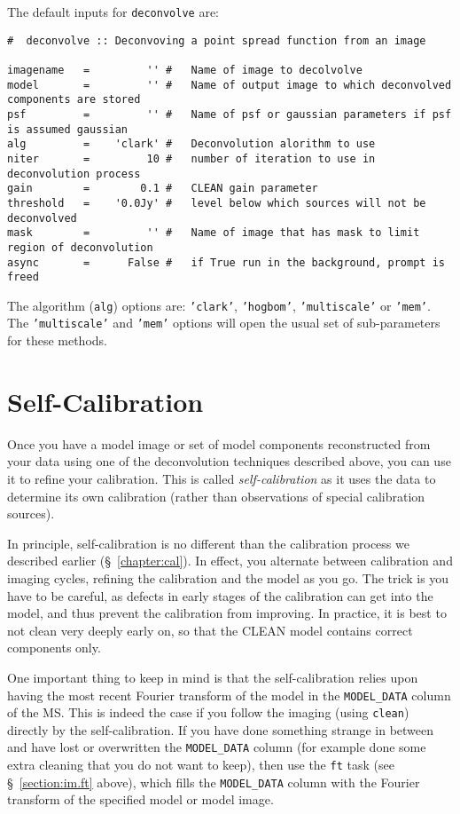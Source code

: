 The default inputs for {\tt deconvolve} are:
\small
\begin{verbatim}
#  deconvolve :: Deconvoving a point spread function from an image

imagename   =         '' #   Name of image to decolvolve
model       =         '' #   Name of output image to which deconvolved components are stored
psf         =         '' #   Name of psf or gaussian parameters if psf is assumed gaussian
alg         =    'clark' #   Deconvolution alorithm to use
niter       =         10 #   number of iteration to use in deconvolution process
gain        =        0.1 #   CLEAN gain parameter 
threshold   =    '0.0Jy' #   level below which sources will not be deconvolved
mask        =         '' #   Name of image that has mask to limit region of deconvolution
async       =      False #   if True run in the background, prompt is freed

\end{verbatim}
\normalsize

The algorithm ({\tt alg}) options are: {\tt 'clark'}, {\tt 'hogbom'}, 
{\tt 'multiscale'} or {\tt 'mem'}.  The {\tt 'multiscale'} and
{\tt 'mem'} options will open the usual set of sub-parameters for these
methods.

\section{Self-Calibration}
\label{section:im.selfcal}

Once you have a model image or set of model components reconstructed
from your data using one of the deconvolution techniques described
above, you can use it to refine your calibration.  This is called
{\it self-calibration} as it uses the data to determine its own
calibration (rather than observations of special calibration sources).

In principle, self-calibration is no different than the calibration
process we described earlier (\S~\ref{chapter:cal}).  In effect, you
alternate between calibration and imaging cycles, refining the calibration
and the model as you go.  The trick is you have to be careful, as defects
in early stages of the calibration can get into the model, and thus
prevent the calibration from improving.  In practice, it is best to
not clean very deeply early on, so that the CLEAN model contains
correct components only.  

One important thing to keep in mind is that the self-calibration
relies upon having the most recent Fourier transform of the
model in the {\tt MODEL\_DATA} column of the MS.  This is indeed
the case if you follow the imaging (using {\tt clean})
directly by the self-calibration.  If you have done something strange
in between and have lost or overwritten the {\tt MODEL\_DATA} column
(for example done some extra cleaning that you do not want to keep),
then use the {\tt ft} task (see \S~\ref{section:im.ft} above), which 
fills the {\tt MODEL\_DATA} column with the Fourier transform of the
specified model or model image.  

